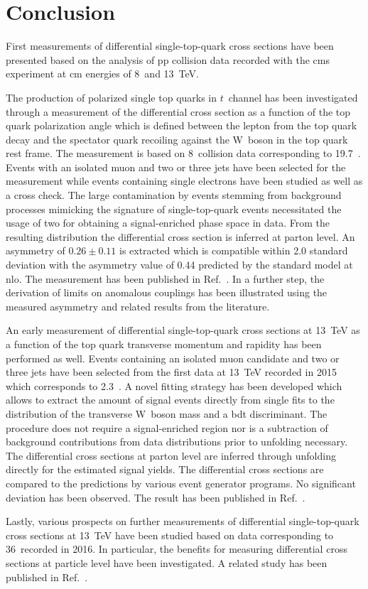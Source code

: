  \chapter{Conclusion}
\label{ch:conclusion}

First measurements of differential single-top-quark cross sections have been presented based on the analysis of \acrlong{pp} collision data recorded with the \gls{cms} experiment at \acrlong{cm} energies of 8~and 13~TeV.

The production of polarized single top quarks in $t$~channel has been investigated through a measurement of the differential cross section as a function of the top quark polarization angle which is defined between the lepton from the top quark decay and the spectator quark recoiling against the W~boson in the top quark rest frame. The measurement is based on 8~\TeV collision data corresponding to 19.7~\invfb. Events with an isolated muon and two or three jets have been selected for the measurement while events containing single electrons have been studied as well as a cross check. The large contamination by events stemming from background processes mimicking the signature of single-top-quark events necessitated the usage of two  for obtaining a signal-enriched phase space in data. From the resulting distribution the differential cross section is inferred at parton level. An asymmetry of $0.26\pm 0.11$ is extracted which is compatible within 2.0 standard deviation with the asymmetry value of 0.44 predicted by the standard model at \gls{nlo}. The measurement has been published in Ref.~\cite{Khachatryan:2015dzz}. In a further step, the derivation of limits on anomalous couplings has been illustrated using the measured asymmetry and related results from the literature.

An early measurement of differential single-top-quark cross sections at 13~TeV as a function of the top quark transverse momentum and rapidity has been performed as well. Events containing an isolated muon candidate and two or three jets have been selected from the first data at 13~TeV recorded in 2015 which corresponds to 2.3~\invfb. A novel fitting strategy has been developed which allows to extract the amount of signal events directly from single fits to the distribution of the transverse W~boson mass and a \gls{bdt} discriminant. The procedure does not require a signal-enriched region nor is a subtraction of background contributions from data distributions prior to unfolding necessary. The differential cross sections at parton level are inferred through unfolding directly for the estimated signal yields. The differential cross sections are compared to the predictions by various event generator programs. No significant deviation has been observed. The result has been published in Ref.~\cite{CMS-PAS-TOP-16-004}.

Lastly, various prospects on further measurements of differential single-top-quark cross sections at 13~TeV have been studied based on data corresponding to 36~\invfb recorded in 2016. In particular, the benefits for measuring differential cross sections at particle level have been investigated. A related study has been published in Ref.~\cite{particleStudies}.
